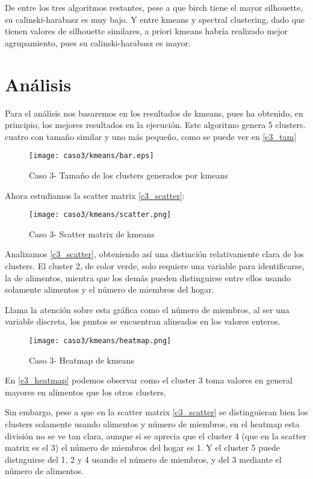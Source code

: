 De entre los tres algoritmos restantes, pese a que birch tiene el mayor silhouette, su calinski-harabasz es muy bajo. Y entre kmeans y spectral clustering, dado que tienen valores de silhouette similares, a priori kmeans habría realizado mejor agrupamiento, pues su calinski-harabasz es mayor.


\section{Análisis}


Para el análisis nos basaremos en los resultados de kmeans, pues ha obtenido, en principio, los mejores resultados en la ejecución. Este algoritmo genera 5 clusters. cuatro con tamaño similar y uno más pequeño, como se puede ver en \eqref{c3_tam}

\begin{figure}[H]
\caption{Caso 3- Tamaño de los clusters generados por kmeans}
\label{c3_tam}
\texttt{[image: caso3/kmeans/bar.eps]}
\end{figure}

Ahora estudiamos la scatter matrix \eqref{c3_scatter}:

\begin{figure}[H]
\caption{Caso 3- Scatter matrix de kmeans}
\label{c3_scatter}
\texttt{[image: caso3/kmeans/scatter.png]}
\end{figure}

Analizamos \eqref{c3_scatter}, obteniendo así una distinción relativamente clara de los clusters. El cluster 2, de color verde, solo requiere una variable para identificarse, la de alimentos, mientra que los demás pueden distinguirse entre ellos usando solamente alimentos y el número de miembros del hogar.

Llama la atención sobre esta gráfica como el número de miembros, al ser una variable discreta, los puntos se encuentran alineados en los valores enteros.

\begin{figure}[H]
\caption{Caso 3- Heatmap de kmeans}
\label{c3_heatmap}
\texttt{[image: caso3/kmeans/heatmap.png]}
\end{figure}

En \eqref{c3_heatmap} podemos observar como el cluster 3 toma valores en general mayores en alimentos que los otros clusters.

Sin embargo, pese a que en la scatter matrix \eqref{c3_scatter} se distinguieran bien los clusters solamente usando alimentos y número de miembros, en el heatmap esta división no se ve tan clara, aunque si se aprecia que el cluster 4 (que en la scatter matrix es el 3) el número de miembros del hogar es 1. Y el cluster 5 puede distnguirse del 1, 2 y 4 usando el número de miembros, y del 3 mediante el número de alimentos.


